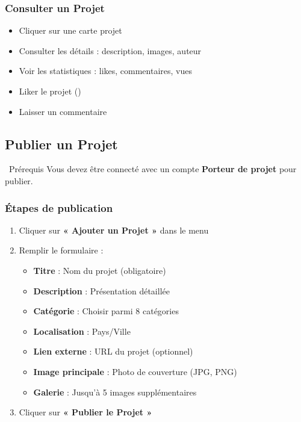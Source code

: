 \documentclass[12pt,a4paper]{article}
\begin{document}
\subsubsection{Consulter un Projet}
\begin{itemize}[leftmargin=*]
    \item Cliquer sur une carte projet
    \item Consulter les détails : description, images, auteur
    \item Voir les statistiques : likes, commentaires, vues
    \item Liker le projet (\faHeart)
    \item Laisser un commentaire
\end{itemize}

\subsection{Publier un Projet}

\begin{warningbox}{\faInfoCircle\ Prérequis}
Vous devez être connecté avec un compte \textbf{Porteur de projet} pour publier.
\end{warningbox}

\subsubsection{Étapes de publication}
\begin{enumerate}[leftmargin=*]
    \item Cliquer sur \textbf{« Ajouter un Projet »} dans le menu
    \item Remplir le formulaire :
    \begin{itemize}
        \item \textbf{Titre} : Nom du projet (obligatoire)
        \item \textbf{Description} : Présentation détaillée
        \item \textbf{Catégorie} : Choisir parmi 8 catégories
        \item \textbf{Localisation} : Pays/Ville
        \item \textbf{Lien externe} : URL du projet (optionnel)
        \item \textbf{Image principale} : Photo de couverture (JPG, PNG)
        \item \textbf{Galerie} : Jusqu'à 5 images supplémentaires
    \end{itemize}
    \item Cliquer sur \textbf{« Publier le Projet »}
\end{enumerate}
\end{document}
